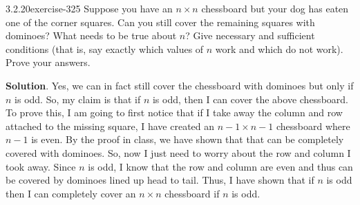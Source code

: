 \documentclass[twoside,11pt,]{book}
\numberwithin{equation}{chapter}
\begin{document}
\begin{divisionsolution}{3.2.20}{}{exercise-325}%
\hypertarget{p-4205}{}%
Suppose you have an \(n\times n\) chessboard but your dog has eaten one of the corner squares. Can you still cover the remaining squares with dominoes? What needs to be true about \(n\)? Give necessary and sufficient conditions (that is, say exactly which values of \(n\) work and which do not work). Prove your answers.%
\begin{sidebyside}{1}{0.4}{0.4}{0}%
\begin{sbspanel}{0.2}%
\end{sbspanel}%
\end{sidebyside}%
\par\smallskip%
\noindent\textbf{Solution}.\quad%
\hypertarget{p-4206}{}%
Yes, we can in fact still cover the chessboard with dominoes but only if \(n\) is odd. So, my claim is that if \(n\) is odd, then I can cover the above chessboard. To prove this, I am going to first notice that if I take away the column and row attached to the missing square, I have created an \(n-1\times n-1\) chessboard where \(n-1\) is even. By the proof in class, we have shown that that can be completely covered with dominoes. So, now I just need to worry about the row and column I took away. Since \(n\) is odd, I know that the row and column are even and thus can be covered by dominoes lined up head to tail. Thus, I have shown that if \(n\) is odd then I can completely cover an \(n\times n\) chessboard if \(n\) is odd.%
\end{divisionsolution}%
\end{document}
